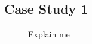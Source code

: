 \subsection{Case Study 1}

\begin{figure}[h]
\centering
	\subfloat[]{\texttt{[image: ]}\label{ChangeMe1}}
	\quad
	\subfloat[]{\texttt{[image: ]}\label{ChangeMe2}}
	\quad
	\subfloat[]{\texttt{[image: ]}\label{ChangeMe3}}
\caption{Explain me}
\label{FigChangeMe}
\end{figure}